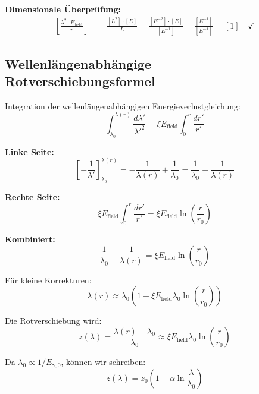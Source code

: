 \documentclass[12pt,a4paper]{report}
\begin{document}
	\textbf{Dimensionale Überprüfung:}
	\begin{align}
		\left[\frac{\lambda^2 \cdot E_{\text{field}}}{r}\right] &= \frac{[L^2] \cdot [E]}{[L]} = \frac{[E^{-2}] \cdot [E]}{[E^{-1}]} = \frac{[E^{-1}]}{[E^{-1}]} = [1] \quad \checkmark
	\end{align}
	
	\subsection{Wellenlängenabhängige Rotverschiebungsformel}
	\label{subsec:wavelength_dependent_redshift_formula}
	
	Integration der wellenlängenabhängigen Energieverlustgleichung:
	\begin{equation}
		\int_{\lambda_0}^{\lambda(r)} \frac{d\lambda'}{\lambda'^2} = \xi E_{\text{field}} \int_0^r \frac{dr'}{r'}
	\end{equation}
	
	\textbf{Linke Seite:}
	\begin{equation}
		\left[-\frac{1}{\lambda'}\right]_{\lambda_0}^{\lambda(r)} = -\frac{1}{\lambda(r)} + \frac{1}{\lambda_0} = \frac{1}{\lambda_0} - \frac{1}{\lambda(r)}
	\end{equation}
	
	\textbf{Rechte Seite:}
	\begin{equation}
		\xi E_{\text{field}} \int_0^r \frac{dr'}{r'} = \xi E_{\text{field}} \ln\left(\frac{r}{r_0}\right)
	\end{equation}
	
	\textbf{Kombiniert:}
	\begin{equation}
		\frac{1}{\lambda_0} - \frac{1}{\lambda(r)} = \xi E_{\text{field}} \ln\left(\frac{r}{r_0}\right)
	\end{equation}
	
	Für kleine Korrekturen:
	\begin{equation}
		\lambda(r) \approx \lambda_0 \left(1 + \xi E_{\text{field}} \lambda_0 \ln\left(\frac{r}{r_0}\right)\right)
	\end{equation}
	
	Die Rotverschiebung wird:
	\begin{equation}
		z(\lambda) = \frac{\lambda(r) - \lambda_0}{\lambda_0} \approx \xi E_{\text{field}} \lambda_0 \ln\left(\frac{r}{r_0}\right)
	\end{equation}
	
	Da $\lambda_0 \propto 1/E_{\gamma,0}$, können wir schreiben:
	\begin{equation}
		\boxed{z(\lambda) = z_0\left(1 - \alpha \ln\frac{\lambda}{\lambda_0}\right)}
		\label{eq:wavelength_dependent_redshift}
	\end{equation}
	
\end{document}
